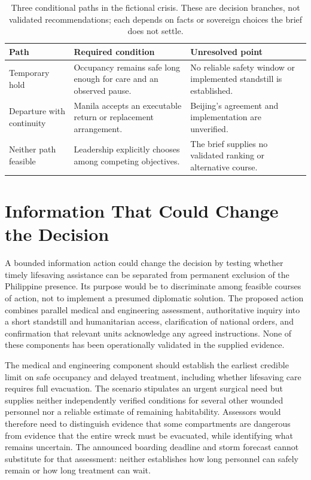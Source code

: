\documentclass[11pt]{article}
\begin{document}
\begin{table}[!htbp]
\centering\small
\caption{Three conditional paths in the fictional crisis. These are decision branches, not validated recommendations; each depends on facts or sovereign choices the brief does not settle.}
\begin{tabular}{@{}>{\raggedright\arraybackslash}p{}>{\raggedright\arraybackslash}p{}>{\raggedright\arraybackslash}p{}@{}}
\toprule
\textbf{Path} & \textbf{Required condition} & \textbf{Unresolved point}\\
\midrule
Temporary hold & Occupancy remains safe long enough for care and an observed pause. & No reliable safety window or implemented standstill is established.\\
Departure with continuity & Manila accepts an executable return or replacement arrangement. & Beijing's agreement and implementation are unverified.\\
Neither path feasible & Leadership explicitly chooses among competing objectives. & The brief supplies no validated ranking or alternative course.\\
\bottomrule
\end{tabular}
\par{}
\end{table}
\section{Information That Could Change the Decision}
A bounded information action could change the decision by testing whether timely lifesaving assistance can be separated from permanent exclusion of the Philippine presence. Its purpose would be to discriminate among feasible courses of action, not to implement a presumed diplomatic solution. The proposed action combines parallel medical and engineering assessment, authoritative inquiry into a short standstill and humanitarian access, clarification of national orders, and confirmation that relevant units acknowledge any agreed instructions. None of these components has been operationally validated in the supplied evidence.

The medical and engineering component should establish the earliest credible limit on safe occupancy and delayed treatment, including whether lifesaving care requires full evacuation. The scenario stipulates an urgent surgical need but supplies neither independently verified conditions for several other wounded personnel nor a reliable estimate of remaining habitability. Assessors would therefore need to distinguish evidence that some compartments are dangerous from evidence that the entire wreck must be evacuated, while identifying what remains uncertain. The announced boarding deadline and storm forecast cannot substitute for that assessment: neither establishes how long personnel can safely remain or how long treatment can wait.
\end{document}
